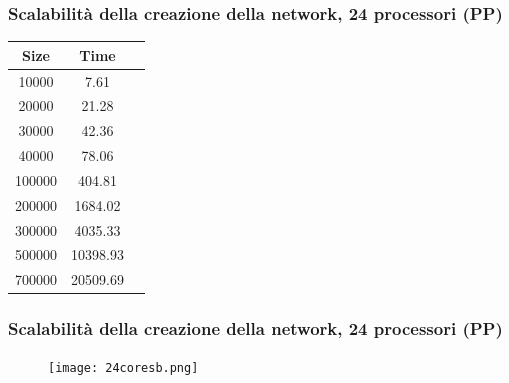 \documentclass{beamer}
\begin{document}
\begin{frame}
 \frametitle{Scalabilità della creazione della network, 24 processori (PP)}
 \begin{center}
\begin{tabular}{|| c | c | c ||}
\hline
Size & Time \\ 
\hline
10000 & 7.61 \\
\hline
20000 & 21.28 \\
\hline
30000 & 42.36 \\
\hline
40000 & 78.06 \\
\hline
100000 & 404.81 \\
\hline
200000 & 1684.02 \\
\hline
300000 & 4035.33 \\
\hline
500000 & 10398.93 \\
\hline
700000 & 20509.69 \\
\hline
\end{tabular}
\end{center}
\end{frame}
\begin{frame}
 \frametitle{Scalabilità della creazione della network, 24 processori (PP)}
  \begin{figure}[htbp]
\centering
\texttt{[image: 24coresb.png]}

\end{figure}
\end{frame}
\end{document}
